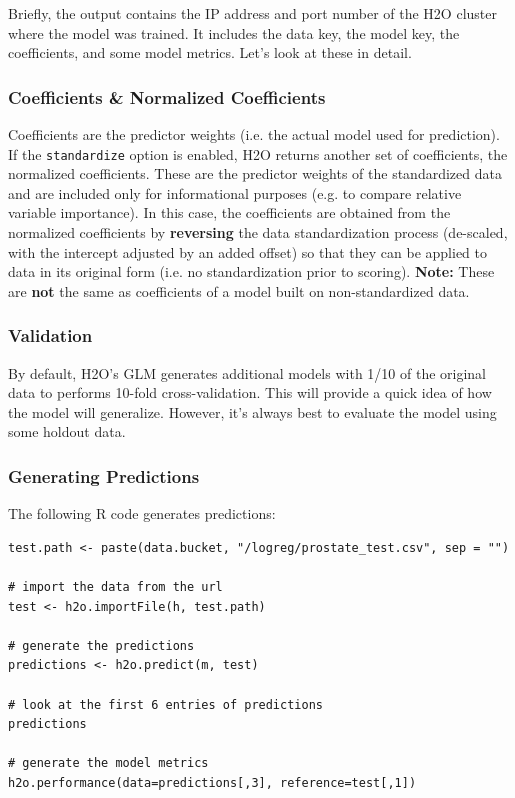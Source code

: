 \documentclass[11pt]{article}
\begin{document}
Briefly, the output contains the IP address and port number of the H2O cluster where the model was trained. It includes the data key, the model key, the coefficients, and  some model metrics. Let's look at these in detail.

\subsubsection{Coefficients \& Normalized Coefficients}
Coefficients are the predictor weights (i.e. the actual model used for prediction).  If the \texttt{standardize} option is enabled, H2O returns another set of coefficients, the normalized coefficients. These are the predictor weights of the standardized data and are included only for informational purposes (e.g. to compare relative variable importance). In this case, the coefficients are obtained from the normalized coefficients by \textbf{reversing} the data standardization process (de-scaled, with the intercept adjusted by an added offset) so that they can be applied to data in its original form (i.e. no standardization prior to scoring). \textbf{Note:} These are \textbf{not} the same as coefficients of a model built on non-standardized data.

\subsubsection{Validation}

By default, H2O's GLM generates additional models with 1/10 of the original data to performs 10-fold cross-validation. This will provide a quick idea of how the model will generalize. However, it's always best to evaluate the model using some holdout data.

\subsubsection{Generating Predictions}

The following R code generates predictions:

\begin{lstlisting}[style=R]
test.path <- paste(data.bucket, "/logreg/prostate_test.csv", sep = "")

# import the data from the url
test <- h2o.importFile(h, test.path)

# generate the predictions
predictions <- h2o.predict(m, test)

# look at the first 6 entries of predictions
predictions

# generate the model metrics
h2o.performance(data=predictions[,3], reference=test[,1])
\end{lstlisting}
\end{document}
